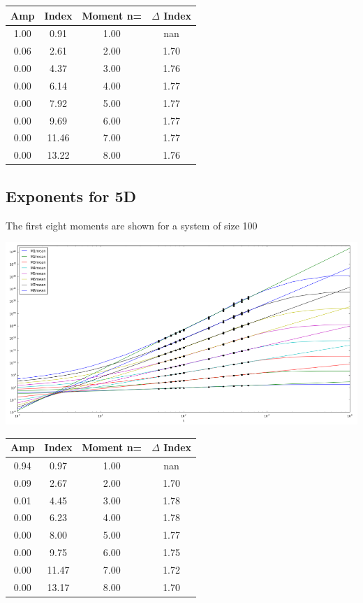 \documentclass{article}
\begin{document}
\begin{multicols}{2}
\begin{center}\begin{tabular}
		{|c|c|c|c|}
		\hline
		\textbf{Amp} & \textbf{Index} & \textbf{Moment n=} & \textbf{$\Delta$ Index}
		\\
		\hline
		1.00 & 0.91 & 1.00 & nan
		\\
		0.06 & 2.61 & 2.00 & 1.70
		\\
		0.00 & 4.37 & 3.00 & 1.76
		\\
		0.00 & 6.14 & 4.00 & 1.77
		\\
		0.00 & 7.92 & 5.00 & 1.77
		\\
		0.00 & 9.69 & 6.00 & 1.77
		\\
		0.00 & 11.46 & 7.00 & 1.77
		\\
		0.00 & 13.22 & 8.00 & 1.76
		\\
		\hline
	\end{tabular}\end{center}
%

\subsection{Exponents for 5D}

The first eight moments are shown for a system of size 100

\begin{center}
	\includegraphics[scale=0.3]{5d_sample}
\end{center}

\begin{center}\begin{tabular}
		{|c|c|c|c|}
		\hline
		\textbf{Amp} & \textbf{Index} & \textbf{Moment n=} & \textbf{$\Delta$ Index}
		\\
		\hline
		0.94 & 0.97 & 1.00 & nan
		\\
		0.09 & 2.67 & 2.00 & 1.70
		\\
		0.01 & 4.45 & 3.00 & 1.78
		\\
		0.00 & 6.23 & 4.00 & 1.78
		\\
		0.00 & 8.00 & 5.00 & 1.77
		\\
		0.00 & 9.75 & 6.00 & 1.75
		\\
		0.00 & 11.47 & 7.00 & 1.72
		\\
		0.00 & 13.17 & 8.00 & 1.70
		\\
		\hline
	\end{tabular}\end{center}
 
\end{multicols}
\end{document}
